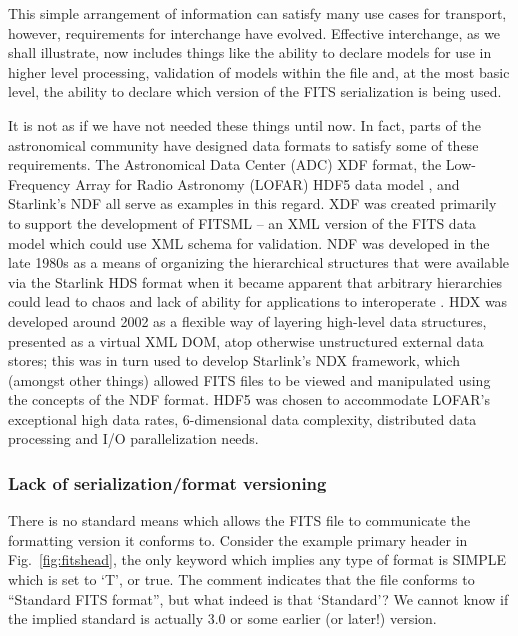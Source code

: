 \documentclass[final,authoryear,5p,times,twocolumn]{elsarticle}
\begin{document}
{{This simple arrangement of information can satisfy many use cases for
transport, however, requirements for interchange have evolved. Effective
interchange, as we shall illustrate, now includes things like the ability to
declare models for use in higher level processing, validation of models within
the file and, at the most basic level, the ability to declare which version of
the FITS serialization is being used.


It is not as if we have not needed these things until now. In fact,
parts of the astronomical community have designed data formats to
satisfy some of these requirements. The Astronomical Data Center (ADC) XDF
format, the Low-Frequency Array for Radio Astronomy (LOFAR) HDF5 data
model \citep{2012ASPC..461..283A}, and Starlink's NDF
\citep{1988STARB...2...11C,1993ASPC...52..229W,P91_adassxxiii} all
serve as examples in this regard. XDF was created primarily to support
the development of FITSML -- an XML version of the FITS data model which
could use XML schema for validation. NDF was developed in the late
1980s as a means of organizing the hierarchical structures that were
available via the Starlink HDS format when it became apparent that
arbitrary hierarchies could lead to chaos and lack of ability for
applications to interoperate \citep{2014Jenness}.
HDX \citep{2003ASPC..295..221G} was developed around 2002 as a flexible
way of layering high-level data structures, presented as a virtual XML
DOM, atop otherwise unstructured external data stores; this was in
turn used to develop Starlink's NDX framework, which (amongst other
things) allowed FITS files to be viewed and manipulated using the
concepts of the NDF format.
HDF5 was chosen to accommodate LOFAR's
exceptional high data rates, 6-dimensional data complexity, distributed
data processing and I/O parallelization needs.

\subsubsection{Lack of serialization/format versioning}


There is no standard means which allows the FITS file to
communicate the formatting version it conforms to.  Consider the example primary header
in Fig.~\ref{fig:fitshead}, the only keyword which implies any type of
format is SIMPLE which is set to `T', or true. The comment indicates that
the file conforms to ``Standard FITS format'', but what indeed is that `Standard'?
We cannot know if the implied standard is actually 3.0 or some earlier (or later!)
version.


}}
\end{document}
